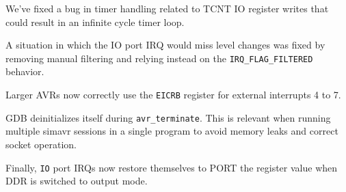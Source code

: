 We've fixed a bug in timer handling related to TCNT \ac{IO} register writes that could
result in an infinite cycle timer loop.

A situation in which the \ac{IO} port \ac{IRQ} would miss level changes was fixed by
removing manual filtering and relying instead on the \lstinline|IRQ_FLAG_FILTERED|
behavior.

Larger \acp{AVR} now correctly use the \lstinline|EICRB| register for external
interrupts 4 to 7.

\ac{GDB} deinitializes itself during \lstinline|avr_terminate|. This is relevant when running multiple simavr sessions in a single program to avoid memory leaks and correct socket operation.

Finally, \lstinline|IO| port \acp{IRQ} now restore themselves to PORT
the register value when \ac{DDR} is switched to output mode.
